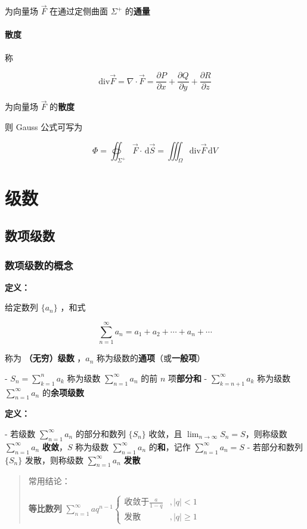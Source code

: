\documentclass[lang = zh , final , oneside , openany , titlepage , zihao = -4 , linespread = 1.3 , baselineskip = false , cjk-font = windows , text-font = newtx , math-font = newtx]{sjtureport}
\begin{document}
为向量场 \(\vec{F}\) 在通过定侧曲面 \(\Sigma^+\) 的\textbf{通量}

\paragraph{散度}

称

\[
\mathrm{div}\vec{F} = \nabla\cdot\vec{F}=\frac{\partial P}{\partial x} + \frac{\partial Q}{\partial y} + \frac{\partial R}{\partial z}
\]

为向量场 \(\vec{F}\) 的\textbf{散度}

则 Gauss 公式可写为

\[
\Phi =\oiint_{\Sigma^+} \vec{F}\cdot\,\mathrm{d}\vec{S} = \iiint_\Omega \mathrm{div}\vec{F}\,\mathrm{d}V
\]

\section{级数}

\subsection{数项级数}

\subsubsection{数项级数的概念}

\textbf{定义：}

给定数列 \(\{a_n\}\) ，和式

\[
\sum_{n = 1}^{\infty} a_n = a_1 + a_2 + \cdots + a_n + \cdots
\]

称为 \textbf{（无穷）级数} ，\(a_n\) 称为级数的\textbf{通项}（或\textbf{一般项}）

- \(S_n = \sum_{k = 1}^n a_k\) 称为级数 \(\sum_{n = 1}^{\infty} a_n\) 的前 \(n\) 项\textbf{部分和}
- \(\sum_{k = n + 1}^\infty a_k\) 称为级数 \(\sum_{n = 1}^{\infty} a_n\) 的\textbf{余项级数}

\textbf{定义：}

- 若级数 \(\sum_{n = 1}^\infty a_n\) 的部分和数列 \(\{S_n\}\) 收敛，且 \(\lim_{n\to\infty}S_n = S\)，则称级数 \(\sum_{n = 1}^\infty a_n\) \textbf{收敛}，\(S\) 称为级数 \(\sum_{n = 1}^\infty a_n\) 的\textbf{和}，记作 \(\sum_{n = 1}^\infty a_n = S\)
- 若部分和数列 \(\{S_n\}\) 发散，则称级数 \(\sum_{n = 1}^\infty a_n\) \textbf{发散}

\begin{quote}
常用结论：

\textbf{等比数列} \(\sum_{n = 1}^\infty aq^{n - 1}\begin{cases}\text{收敛于}\frac{a}{1 - q} & ,\vert q \vert < 1\\ \text{发散} & ,\vert q \vert \geq 1\end{cases}\)
\end{quote}
\end{document}

